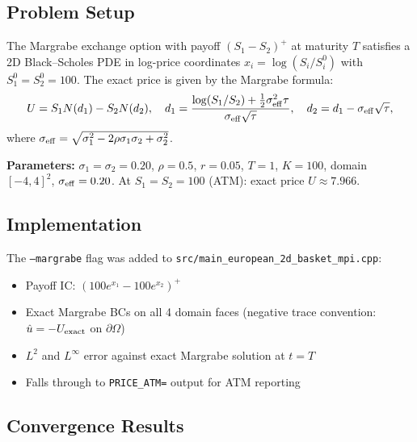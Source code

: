 \documentclass[11pt,a4paper]{article}
\begin{document}
\subsection{Problem Setup}

The Margrabe exchange option with payoff $(S_1 - S_2)^+$ at maturity $T$
satisfies a 2D Black--Scholes PDE in log-price coordinates
$x_i = \log(S_i / S_i^0)$ with $S_1^0 = S_2^0 = 100$.
The exact price is given by the Margrabe formula:
\begin{equation}
  U = S_1 N(d_1) - S_2 N(d_2),
  \quad
  d_1 = \frac{\log(S_1/S_2) + \tfrac{1}{2}\sigma_{\rm eff}^2 \tau}{\sigma_{\rm eff}\sqrt{\tau}},
  \quad
  d_2 = d_1 - \sigma_{\rm eff}\sqrt{\tau},
\end{equation}
where $\sigma_{\rm eff} = \sqrt{\sigma_1^2 - 2\rho\sigma_1\sigma_2 + \sigma_2^2}$.

\medskip
\noindent\textbf{Parameters:}
$\sigma_1 = \sigma_2 = 0.20$, $\rho = 0.5$, $r = 0.05$, $T = 1$, $K = 100$,
domain $[-4,4]^2$, $\sigma_{\rm eff} = 0.20$.
At $S_1 = S_2 = 100$ (ATM): exact price $U \approx 7.966$.

\subsection{Implementation}

The \texttt{--margrabe} flag was added to
\texttt{src/main\_european\_2d\_basket\_mpi.cpp}:
\begin{itemize}
  \item Payoff IC: $(100 e^{x_1} - 100 e^{x_2})^+$
  \item Exact Margrabe BCs on all 4 domain faces (negative trace convention:
        $\hat{u} = -U_{\rm exact}$ on $\partial\Omega$)
  \item $L^2$ and $L^\infty$ error against exact Margrabe solution at $t=T$
  \item Falls through to \texttt{PRICE\_ATM=} output for ATM reporting
\end{itemize}

\subsection{Convergence Results}
\end{document}
